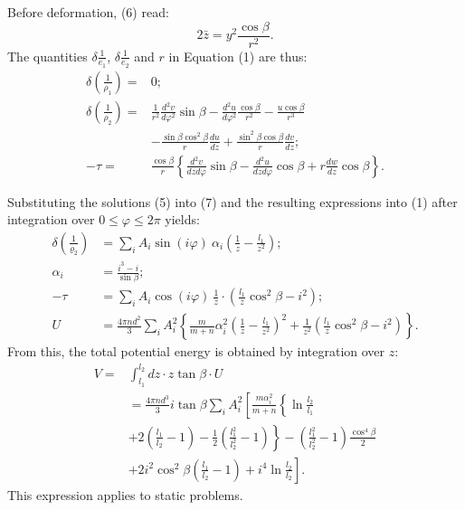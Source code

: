 \documentclass{amsart}
\begin{document}
Before deformation, (6) read:
\[2\bar{z}=y^2 \frac{\cos \beta}{r^2}.\]
The quantities
\(\delta \frac{1}{e_1}\), \(\delta \frac{1}{e_2} \)
and \(r\) in Equation (1) are thus:
\begin{equation}\label{eq7p733}
\begin{aligned}
\delta\left(\frac{1}{\rho_1}\right)= & 0; \\
\delta\left(\frac{1}{\rho_2}\right)= & \frac{1}{r^2} \frac{d^2 v}{d \varphi^2} \sin \beta-\frac{d^2 u}{d \varphi^2} \frac{\cos \beta}{r^2}-\frac{u \cos \beta}{r^3} \\
& -\frac{\sin \beta \cos ^2 \beta}{r} \frac{d u}{d z}+\frac{\sin ^2 \beta \cos \beta}{r} \frac{d v}{d z}; \\
-\tau= & \frac{\cos \beta}{r}\left\{\frac{d^2 v}{d z d \varphi} \sin \beta-\frac{d^2 u}{d z d \varphi} \cos \beta
+r \frac{d w}{d z} \cos \beta\right\} .
\end{aligned}
\end{equation}


Substituting the solutions (5) into (7) and the resulting expressions into (1)
after integration over \( 0 \leq \varphi \leq 2 \pi \) yields:
\begin{equation}\label{eq8p733}
\begin{aligned}
\delta\left(\frac{1}{\varrho_2}\right) & =\sum_i A_i \sin(i \varphi) ~ \alpha_i\left(\frac{1}{z}-\frac{l_1}{z^2}\right); \\
\alpha_i & =\frac{i^3-i}{\sin \beta}; \\
-\tau & =\sum_i A_i \cos( i \varphi) ~ \frac{1}{z} \cdot\left(\frac{l_1}{z} \cos ^2 \beta-i^2\right); \\
U & =\frac{4 \pi n d^2}{3} \sum_i A_i^2\left\{\frac{m}{m+n} \alpha_i^2\left(\frac{1}{z}-\frac{l_1}{z^2}\right)^2
 +\frac{1}{z^2}\left(\frac{l_1}{z} \cos ^2 \beta-i^2\right)\right\} .
\end{aligned}
\end{equation}
From this, the total potential energy is obtained by integration over \(z\):
\begin{equation}\label{eq9p733}
\begin{aligned}
V= & \int_{l_1}^{l_2} d z \cdot z \tan \beta \cdot U \\
& =\frac{4 \pi n d^3}{3}i \tan \beta \sum_i A_i^2\left[\frac { m \alpha _ { i } ^ { 2 } } { m + n } \left\{\ln \frac{l_2}{l_1}\right.\right. \\
& \left.+2\left(\frac{l_1}{l_2}-1\right)-\frac{1}{2}\left(\frac{l_1^2}{l_2^2}-1\right)\right\}-\left(\frac{l_1^2}{l_2^2}-1\right) \frac{\cos ^4 \beta}{2} \\
& \left.+2 i^2 \cos ^2 \beta\left(\frac{l_1}{l_2}-1\right)+i^4 \ln \frac{l_2}{l_2}\right] .
\end{aligned}
\end{equation}
This expression applies to static problems.
\end{document}
